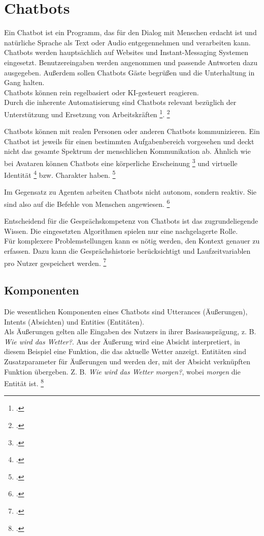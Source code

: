 \section{Chatbots}
Ein Chatbot ist ein Programm, das für den Dialog mit Menschen erdacht ist und natürliche Sprache als Text oder Audio entgegennehmen und verarbeiten kann.
Chatbots werden hauptsächlich auf Websites und Instant-Messaging Systemen eingesetzt.
Benutzereingaben werden angenommen und passende Antworten dazu ausgegeben. Außerdem sollen Chatbots Gäste begrüßen und die Unterhaltung in Gang halten.\\
Chatbots können rein regelbasiert oder \acf{KI}-gesteuert reagieren.\\
Durch die inherente Automatisierung sind Chatbots relevant bezüglich der \glqq{}Unterstützung und Ersetzung von Arbeitskräften\grqq
\footcite[][o. \pno]{Bendel_2018_Chatbot_Definition}{}.
\footcite[Vgl.][o. \pno]{Bendel_2018_Chatbot_Definition}

Chatbots können mit realen Personen oder anderen Chatbots kommunizieren. Ein Chatbot ist jeweils für einen bestimmten Aufgabenbereich vorgesehen und deckt nicht das gesamte Spektrum der menschlichen Kommunikation ab. Ähnlich wie bei Avataren können Chatbots eine \glqq{}körperliche Erscheinung\grqq
\footcite[][71\psq]{de_Vries_2006}
und \glqq{}virtuelle Identität\grqq
\footcite[][71\psq]{de_Vries_2006}
bzw. Charakter haben.
\footcite[Vgl.][71\psq]{de_Vries_2006}

Im Gegensatz zu Agenten arbeiten Chatbots nicht autonom, sondern reaktiv. Sie sind also auf die Befehle von Menschen angewiesen.
\footcite[Vgl.][69\psqq]{de_Vries_2006}

Entscheidend für die Gesprächskompetenz von Chatbots ist das zugrundeliegende Wissen. Die eingesetzten Algorithmen spielen nur eine nachgelagerte Rolle.\\
Für komplexere Problemstellungen  kann es nötig werden, den Kontext genauer zu erfassen. Dazu kann die Gesprächshistorie berücksichtigt und Laufzeitvariablen pro Nutzer gespeichert werden.
\footcite[Vgl.][82\psq]{Feindt_2006_Agenten}

\subsection{Komponenten}
Die wesentlichen Komponenten eines Chatbots sind Utterances (Äußerungen), Intents (Absichten) und Entities (Entitäten).\\
Als Äußerungen gelten alle Eingaben des Nutzers in ihrer Basisausprägung, z. B. \textit{Wie wird das Wetter?}.
Aus der Äußerung wird eine Absicht interpretiert, in diesem Beispiel eine Funktion, die das aktuelle Wetter anzeigt.
Entitäten sind Zusatzparameter für Äußerungen und werden der, mit der Absicht verknüpften Funktion übergeben. Z. B. \textit{Wie wird das Wetter morgen?}, wobei \textit{morgen} die Entität ist.
\footcite[Vgl.][51]{Groetz_2018_Sprich_mit_mir}

